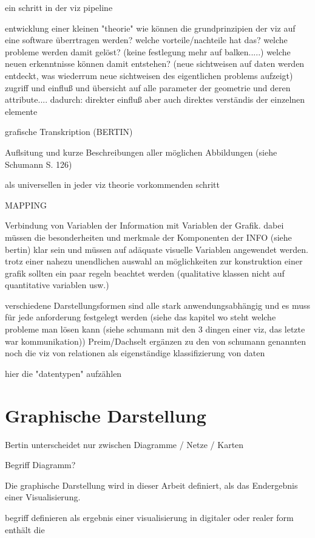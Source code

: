\documentclass[a4paper, 12pt, DIVcalc, onepage, pdftex, headsepline, footsepline]{scrreprt}
\begin{document}
ein schritt in der viz pipeline

entwicklung einer kleinen "theorie"
wie können die grundprinzipien der viz auf eine software überrtragen werden?
welche vorteile/nachteile hat das?
welche probleme werden damit gelöst? (keine festlegung mehr auf balken.....)
welche neuen erkenntnisse können damit entstehen? (neue sichtweisen auf daten werden entdeckt, was wiederrum neue sichtweisen des eigentlichen problems aufzeigt)
zugriff und einfluß und übersicht auf alle parameter der geometrie und deren attribute....
dadurch: direkter einfluß aber auch direktes verständis der einzelnen elemente

grafische Transkription (BERTIN)

Auflsitung und kurze Beschreibungen aller möglichen Abbildungen (siehe Schumann S. 126)

als universellen in jeder viz theorie vorkommenden schritt

MAPPING

Verbindung von Variablen der Information mit Variablen der Grafik.
dabei müssen die besonderheiten und merkmale der Komponenten der INFO (siehe bertin) klar sein und müssen auf adäquate visuelle Variablen angewendet werden.
trotz einer nahezu unendlichen auswahl an möglichkeiten zur konstruktion einer grafik sollten ein paar regeln beachtet werden (qualitative klassen nicht auf quantitative variablen usw.)


verschiedene Darstellungsformen
sind alle stark anwendungsabhängig und es muss für jede anforderung festgelegt werden (siehe das kapitel wo steht welche probleme man lösen kann (siehe schumann mit den 3 dingen einer viz, das letzte war kommunikation))
Preim/Dachselt ergänzen zu den von schumann genannten noch die viz von relationen als eigenständige klassifizierung von daten

hier die "datentypen" aufzählen

\section{Graphische Darstellung}
\label{sec:Darstellungen}


Bertin unterscheidet nur zwischen Diagramme / Netze / Karten

Begriff Diagramm?

Die graphische Darstellung wird in dieser Arbeit definiert, als das Endergebnis einer
Visualisierung.

begriff definieren als ergebnis einer visualisierung in digitaler oder realer form
enthält die 
\end{document}
